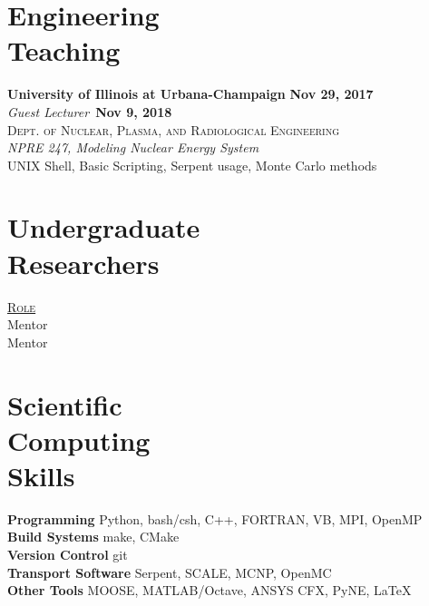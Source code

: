 \documentclass[margin,line]{resume}
\begin{document}
\begin{resume}
    \section{\mysidestyle Engineering\\Teaching}
    \textbf{University of Illinois at Urbana-Champaign} \hfill \textbf{Nov 29, 2017}\\
    \textsl{Guest Lecturer}~\hfill \textbf{Nov 9, 2018}\\
    \textsc{Dept. of Nuclear, Plasma, and Radiological Engineering}\\ 
               \textsl{NPRE 247, Modeling Nuclear Energy System}\\
               UNIX Shell, Basic Scripting, Serpent usage, Monte Carlo methods
               \vspace{2mm}
    \section{\mysidestyle Undergraduate\\Researchers}
    \hfill\textsc{\underline{Role}}\\
    \hfill Mentor\\
    \hfill Mentor\\
    \section{\mysidestyle Scientific\\Computing\\Skills}
                \textbf{Programming} \hfill Python, bash/csh, C++, FORTRAN, 
                VB, MPI, OpenMP \vspace{.5mm}\\%
                \textbf{Build Systems} \hfill make, CMake\vspace{.5mm}\\%
                \textbf{Version Control} \hfill git\vspace{.5mm}\\%
                \textbf{Transport Software} \hfill Serpent, SCALE, MCNP, 
                OpenMC\vspace{.5mm}\\%
                \textbf{Other Tools} \hfill  MOOSE, MATLAB/Octave, ANSYS CFX, 
                PyNE, \LaTeX \vspace{.5mm}%


\end{resume}
\end{document}
